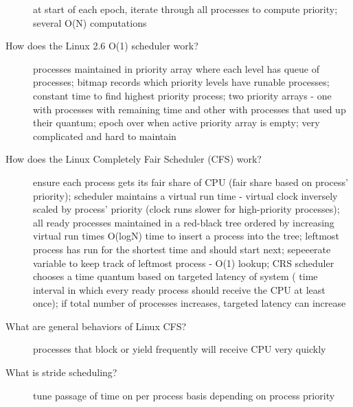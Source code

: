 \documentclass[10pt]{article}
\begin{document}
\begin{description}
  at start of each epoch, iterate through all processes to compute priority;
  several O(N) computations
\item[How does the Linux 2.6 O(1) scheduler work?]
  processes maintained in priority array where each level has queue of processes;
  bitmap records which priority levels have runable processes;
  constant time to find highest priority process;
  two priority arrays - one with processes with remaining time and other with processes that used up their quantum;
  epoch over when active priority array is empty;
  very complicated and hard to maintain
\item[How does the Linux Completely Fair Scheduler (CFS) work?]
  ensure each process gets its fair share of CPU (fair share based on process' priority);
  scheduler maintains a virtual run time - virtual clock inversely scaled by process' priority (clock runs slower for high-priority processes);
  all ready processes maintained in a red-black tree ordered by increasing virtual run times O(logN) time to insert a process into the tree;
  leftmost process has run for the shortest time and should start next;
  sepeeerate variable to keep track of leftmost process - O(1) lookup;
  CRS scheduler chooses a time quantum based on targeted latency of system ( time interval in which every ready process should receive the CPU at least once);
  if total number of processes increases, targeted latency can increase
\item[What are general behaviors of Linux CFS?]
  processes that block or yield frequently will receive CPU very quickly
\item[What is stride scheduling?]
  tune passage of time on per process basis depending on process priority
\end{description}
\end{document}
